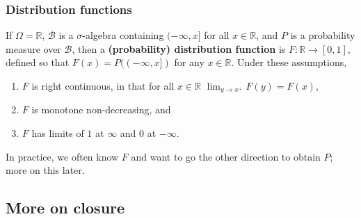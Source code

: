 \documentclass[12pt]{article}
\begin{document}
\subsubsection*{Distribution functions}

If $\Omega = \mathbb R$, $\mathcal B$ is a $\sigma$-algebra containing $(-\infty, x]$ for all $x \in \mathbb R$, and $P$ is a probability measure over $\mathcal B$, then a \textbf{(probability) distribution function} is $F : \mathbb R \to [0, 1]$, defined so that $F(x) = P((-\infty, x])$ for any $x \in \mathbb R$. Under these assumptions,
\begin{enumerate}
\item $F$ is right continuous, in that for all $x \in \mathbb R$ $\lim_{y \to x^+} F(y) = F(x)$,
\item $F$ is monotone non-decreasing, and
\item $F$ has limits of $1$ at $\infty$ and $0$ at $-\infty$.
\end{enumerate}
In practice, we often know $F$ and want to go the other direction to obtain $P$; more on this later.

\subsection{More on closure}
\end{document}
